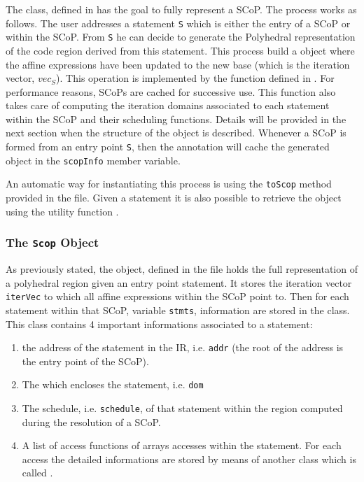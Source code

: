 The  class, defined in
 has the goal to fully represent a SCoP.
The process works as follows. The user addresses a statement {\tt S} which is
either the entry of a SCoP or within the SCoP. From {\tt S} he can decide to
generate the Polyhedral representation of the code region derived from this
statement. This process build a  object where the affine expressions
have been updated to the new base (which is the iteration vector, $vec_S$). This
operation is implemented by the  function defined in
. For performance reasons, SCoPs are cached
for successive use. This function also takes care of computing the iteration
domains associated to each statement within the SCoP and their scheduling
functions. Details will be provided in the next section when the structure of
the  object is described.  Whenever a SCoP is formed from an entry
point {\tt S}, then the  annotation will cache the generated
 object in the {\tt scopInfo} member variable. 

An automatic way for instantiating this process is using the {\tt toScop} method
provided in the  file.  Given a statement it is
also possible to retrieve the  object using the utility function
. 

\subsubsection{The {\tt Scop} Object}

As previously stated, the  object, defined in the file
  holds the full representation of a
polyhedral region given an entry point statement. It stores the iteration vector
{\tt iterVec} to which all affine expressions within the SCoP point to. Then for
each statement within that SCoP, variable {\tt stmts}, information are stored in
the  class. This class contains 4 important informations associated
to a statement: 
\begin{enumerate}
	\item the address of the statement in the IR, i.e. {\tt addr} (the
			root of the address is the entry point of the SCoP). 

	\item The  which encloses the statement, i.e. {\tt dom} 
	
	\item The schedule, i.e. {\tt schedule}, of that statement within the region
		computed during the resolution of a SCoP. 

	\item A list of access functions of arrays accesses within the statement. For
		each access the detailed informations are stored by means of another class
		which is called . 

\end{enumerate}

